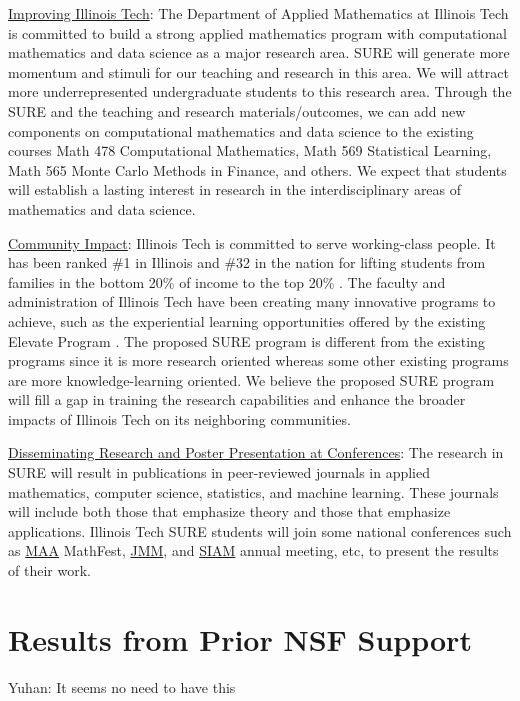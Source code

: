 \documentclass[11pt]{NSFamsart}
\newcommand{\Upara}[1]{\noindent\underline{\upshape #1}:}
\newcommand{\MAA}{\hyperlink{MAAlink}{MAA}\xspace}
\newcommand{\JMM}{\hyperlink{JMMlink}{JMM}\xspace}
\newcommand{\SIAM}{\hyperlink{SIAMlink}{SIAM}\xspace}
\newcommand{\YDNote}[1]{{\color{magenta}Yuhan: #1}}
\begin{document}
\Upara{Improving Illinois Tech}
The Department of Applied Mathematics at Illinois Tech is committed to build a strong applied mathematics program with computational mathematics and data science as a major research area. 
SURE will generate more momentum and stimuli for our teaching and research in this area. We will attract more underrepresented undergraduate students to this research area. Through the SURE and the teaching and research materials/outcomes, we can add new components on computational mathematics and data science to the existing courses Math 478 Computational Mathematics, Math 569 Statistical Learning, Math 565 Monte Carlo Methods in Finance, and others.
We expect that students will establish a lasting interest in research in the interdisciplinary areas of mathematics and data science.

\Upara{Community Impact}
Illinois Tech is committed to serve working-class people. 
It has been ranked \#1 in Illinois and \#32 in the nation for lifting students from families in the bottom 20\% of income to the top 20\% \cite{IITrank}. 
The faculty and administration of Illinois Tech have been creating many innovative programs to achieve, such as the experiential learning opportunities offered by the existing Elevate Program \cite{IITElevate}.
The proposed SURE program is different from the existing programs since it is more research oriented whereas some other existing programs are more knowledge-learning oriented. 
We believe the proposed SURE program will fill a gap in training the research capabilities and enhance the broader impacts of Illinois Tech on its neighboring communities. 

\Upara{Disseminating Research and Poster Presentation at Conferences}
The research in SURE will result in publications in peer-reviewed journals in applied mathematics, computer science, statistics, and machine learning. These journals will include both those that emphasize theory and those that emphasize applications. Illinois Tech  SURE students will join some national conferences such as \MAA MathFest, \JMM, and \SIAM annual meeting, etc, to present the results of their work.


\section{Results from Prior NSF Support} \label{sec:prior_work}
\YDNote{It seems no need to have this}
\end{document}
